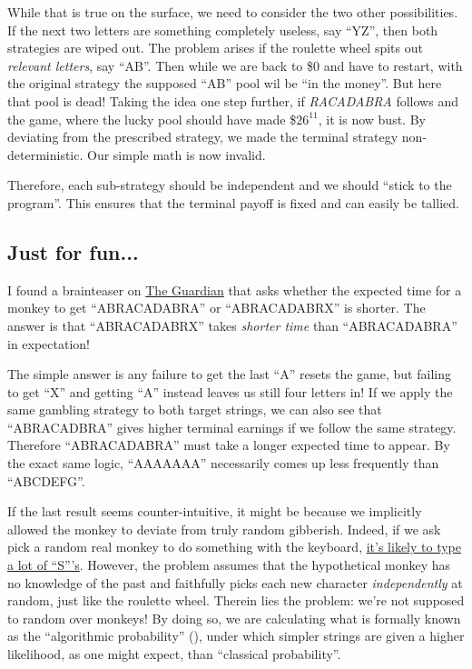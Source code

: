\documentclass[11pt]{article}
\begin{document}
While that is true on the surface, we need to consider the two other possibilities. If the next two letters are something completely useless, say ``YZ'', then both strategies are wiped out. The problem arises if the roulette wheel spits out \emph{relevant letters}, say ``AB''. Then while we are back to \$0 and have to restart, with the original strategy the supposed ``AB'' pool wil be ``in the money''. But here that pool is dead! Taking the idea one step further, if \textit{RACADABRA} follows and the game, where the lucky pool should have made \$$26^{11}$, it is now bust. By deviating from the prescribed strategy, we made the terminal strategy non-deterministic. Our simple math is now invalid.

Therefore, each sub-strategy should be independent and we should ``stick to the program''. This ensures that the terminal payoff is fixed and can easily be tallied.

\subsection{Just for fun...}
I found a brainteaser on \href{https://www.theguardian.com/science/2023/mar/20/can-you-solve-it-the-infinite-monkey-theorem}{The Guardian} that asks whether the expected time for a monkey to get ``ABRACADABRA'' or ``ABRACADABRX'' is shorter. The answer is that ``ABRACADABRX'' takes \emph{shorter time} than ``ABRACADABRA'' in expectation! 

The simple answer is any failure to get the last ``A'' resets the game, but failing to get ``X'' and getting ``A'' instead leaves us still four letters in! If we apply the same gambling strategy to both target strings, we can also see that ``ABRACADBRA'' gives higher terminal earnings if we follow the same strategy. Therefore ``ABRACADABRA'' must take a longer expected time to appear. By the exact same logic, ``AAAAAAA'' necessarily comes up less frequently than ``ABCDEFG''.

If the last result seems counter-intuitive, it might be because we implicitly allowed the monkey to deviate from truly random gibberish. Indeed, if we ask pick a random real monkey to do something with the keyboard, \href{https://www.bbc.co.uk/devon/news_features/2003/monkey_words.shtml}{it's likely to type a lot of ``S'''s}. However, the problem assumes that the hypothetical monkey has no knowledge of the past and faithfully picks each new character \emph{independently} at random, just like the roulette wheel. Therein lies the problem: we're not supposed to random over monkeys! By doing so, we are calculating what is formally known as the ``algorithmic probability'' (\cite{Hutter:2007}), under which simpler strings are given a higher likelihood, as one might expect, than ``classical probability''.
\end{document}
